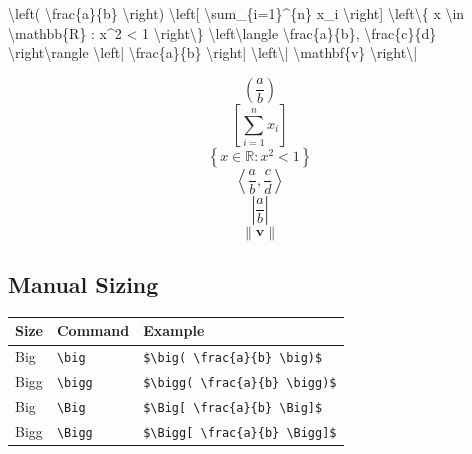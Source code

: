 \documentclass[
  letterpaper,
  DIV=11,
  numbers=noendperiod]{scrartcl}
\newenvironment{Shaded}{\begin{snugshade}}{\end{snugshade}}
\newcommand{\SpecialCharTok}[1]{\textcolor[rgb]{0.37,0.37,0.37}{#1}}
\newcommand{\SpecialStringTok}[1]{\textcolor[rgb]{0.13,0.47,0.30}{#1}}
\begin{document}
\begin{Shaded}
\begin{Highlighting}[]
\SpecialStringTok{$$}\SpecialCharTok{\textbackslash{}left}\SpecialStringTok{( }\SpecialCharTok{\textbackslash{}frac}\SpecialStringTok{\{a\}\{b\} }\SpecialCharTok{\textbackslash{}right}\SpecialStringTok{)$$}
\SpecialStringTok{$$}\SpecialCharTok{\textbackslash{}left}\SpecialStringTok{[ }\SpecialCharTok{\textbackslash{}sum}\SpecialStringTok{\_\{i=1\}\^{}\{n\} x\_i }\SpecialCharTok{\textbackslash{}right}\SpecialStringTok{]$$}
\SpecialStringTok{$$}\SpecialCharTok{\textbackslash{}left\textbackslash{}\{}\SpecialStringTok{ x }\SpecialCharTok{\textbackslash{}in}\SpecialStringTok{ }\SpecialCharTok{\textbackslash{}mathbb}\SpecialStringTok{\{R\} : x\^{}2 \textless{} 1 }\SpecialCharTok{\textbackslash{}right\textbackslash{}\}}\SpecialStringTok{$$}
\SpecialStringTok{$$}\SpecialCharTok{\textbackslash{}left\textbackslash{}langle}\SpecialStringTok{ }\SpecialCharTok{\textbackslash{}frac}\SpecialStringTok{\{a\}\{b\}, }\SpecialCharTok{\textbackslash{}frac}\SpecialStringTok{\{c\}\{d\} }\SpecialCharTok{\textbackslash{}right\textbackslash{}rangle}\SpecialStringTok{$$}
\SpecialStringTok{$$}\SpecialCharTok{\textbackslash{}left}\SpecialStringTok{| }\SpecialCharTok{\textbackslash{}frac}\SpecialStringTok{\{a\}\{b\} }\SpecialCharTok{\textbackslash{}right}\SpecialStringTok{|$$}
\SpecialStringTok{$$}\SpecialCharTok{\textbackslash{}left\textbackslash{}|}\SpecialStringTok{ }\SpecialCharTok{\textbackslash{}mathbf}\SpecialStringTok{\{v\} }\SpecialCharTok{\textbackslash{}right\textbackslash{}|}\SpecialStringTok{$$}
\end{Highlighting}
\end{Shaded}

\[\left( \frac{a}{b} \right)\] \[\left[ \sum_{i=1}^{n} x_i \right]\]
\[\left\{ x \in \mathbb{R} : x^2 < 1 \right\}\]
\[\left\langle \frac{a}{b}, \frac{c}{d} \right\rangle\]
\[\left| \frac{a}{b} \right|\] \[\left\| \mathbf{v} \right\|\]

\hypertarget{manual-sizing}{%
\subsection{Manual Sizing}\label{manual-sizing}}

\begin{longtable}[]{@{}lll@{}}
\toprule()
Size & Command & Example \\
\midrule()
\endhead
Big & \texttt{\textbackslash{}big} &
\texttt{\$\textbackslash{}big(\ \textbackslash{}frac\{a\}\{b\}\ \textbackslash{}big)\$} \\
Bigg & \texttt{\textbackslash{}bigg} &
\texttt{\$\textbackslash{}bigg(\ \textbackslash{}frac\{a\}\{b\}\ \textbackslash{}bigg)\$} \\
Big & \texttt{\textbackslash{}Big} &
\texttt{\$\textbackslash{}Big{[}\ \textbackslash{}frac\{a\}\{b\}\ \textbackslash{}Big{]}\$} \\
Bigg & \texttt{\textbackslash{}Bigg} &
\texttt{\$\textbackslash{}Bigg{[}\ \textbackslash{}frac\{a\}\{b\}\ \textbackslash{}Bigg{]}\$} \\
\bottomrule()
\end{longtable}
\end{document}
